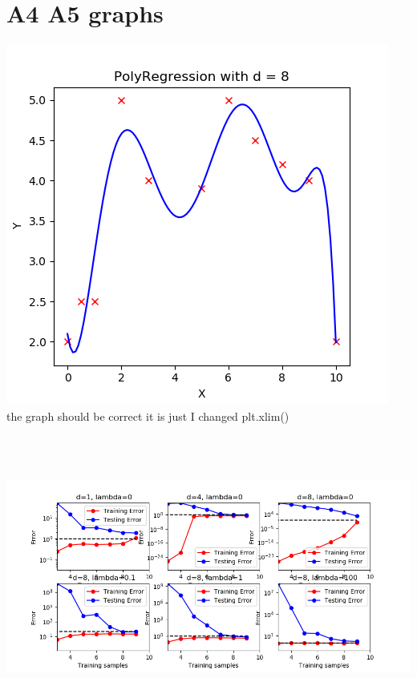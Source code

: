 \documentclass[12pt]{article}
\begin{document}
\section*{A4 A5 graphs}
\includegraphics{../code/A4.png}\\
\newpage
the graph should be correct it is just I changed plt.xlim()\\ 
\noindent\includegraphics[width =15cm, height = 10cm]{../code/A5.png}
\newpage
\end{document}
